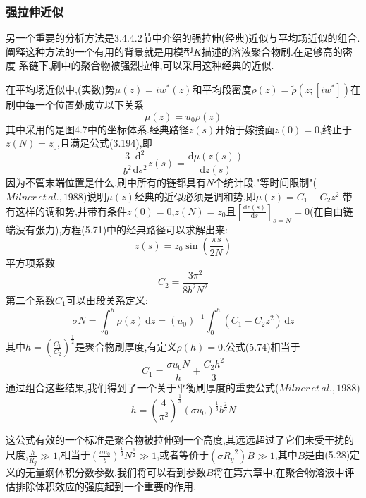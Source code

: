 \subsubsection{强拉伸近似}
另一个重要的分析方法是3.4.4.2节中介绍的强拉伸(经典)近似与平均场近似的组合.阐释这种方法的一个有用的背景就是用模型$K$描述的溶液聚合物刷.在足够高的密度
系链下,刷中的聚合物被强烈拉伸,可以采用这种经典的近似.

在平均场近似中,(实数)势$\mu(z) = iw^*(z)$和平均段密度$\rho(z) = \tilde{\rho}(z;[iw^*])$在刷中每一个位置处成立以下关系
\begin{equation}
\mu(z) = u_0\rho(z)
\end{equation}
其中采用的是图4.7中的坐标体系.经典路径$z(s)$开始于嫁接面$z(0)=0$,终止于$z(N)=z_0$,且满足公式(3.194),即
\begin{equation}
\frac{3}{b^2}\frac{\mathrm{d}^2}{\mathrm{d} s^2}z(s) = \frac{\mathrm{d}\mu(z(s))}{\mathrm{d}z(s)}
\end{equation}
因为不管末端位置是什么,刷中所有的链都具有$N$个统计段,"等时间限制"($Milner\,et\,al.,1988$)说明$\mu(z)$经典的近似必须是调和势,即$\mu(z) = C_1-C_2 z^2$.带有这样的调和势,并带有条件$z(0)=0$,$z(N)=z_0$且$[\frac{\mathrm{d}z(s)}{\mathrm{d}s}]_{s=N} = 0$(在自由链端没有张力),方程(5.71)中的经典路径可以求解出来:
\begin{equation}
z(s) = z_0 \sin(\frac{\pi s}{2N})
\end{equation}
平方项系数
\begin{equation}
C_2 = \frac{3\pi^2}{8b^2N^2}
\end{equation}
第二个系数$C_1$可以由段关系定义:
\begin{equation}
\sigma N = \int_{0}^{h}\rho(z)\,\mathrm{d}z = (u_0)^{-1}\int_{0}^{h}(C_1-C_2 z^2)\,\mathrm{d}z
\end{equation}
其中$h=(\frac{C_1}{C_2})^{\frac{1}{2}}$是聚合物刷厚度,有定义$\rho(h)=0$.公式(5.74)相当于
\begin{equation}
C_1 = \frac{\sigma u_0 N}{h}+\frac{C_2 h^2}{3}
\end{equation}
通过组合这些结果,我们得到了一个关于平衡刷厚度的重要公式($Milner\,et\,al.,1988$)
\begin{equation}
h = (\frac{4}{\pi^2})^{\frac{1}{3}}(\sigma u_0)^{\frac{1}{3}}b^{\frac{2}{3}}N
\end{equation}

这公式有效的一个标准是聚合物被拉伸到一个高度,其远远超过了它们未受干扰的尺度,$\frac{h}{R_g}\gg 1$,相当于$(\frac{\sigma u_0}{b})^{\frac{1}{3}}N^{\frac{1}{2}}\gg 1$,或者等价于$(\sigma {R_g}^2)B\gg 1$,其中$B$是由(5.28)定义的无量纲体积分数参数.我们将可以看到参数$B$将在第六章中,在聚合物溶液中评估排除体积效应的强度起到一个重要的作用.

